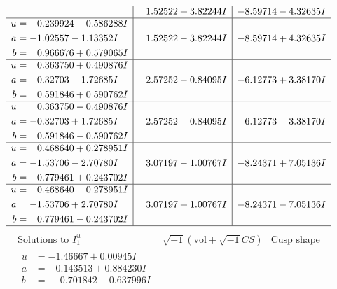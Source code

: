 \documentclass[1p]{elsarticle_modified}
\theoremstyle{definition}
\newcommand{\I}{\sqrt{-1}}
\begin{document}
$$\begin{array}{c|c|c}
 & \phantom{-}1.52522 + 3.82244 I & -8.59714 - 4.32635 I \\ \hline\begin{aligned}
u &= \phantom{-}0.239924 - 0.586288 I \\
a &= -1.02557 - 1.13352 I \\
b &= \phantom{-}0.966676 + 0.579065 I\end{aligned}
 & \phantom{-}1.52522 - 3.82244 I & -8.59714 + 4.32635 I \\ \hline\begin{aligned}
u &= \phantom{-}0.363750 + 0.490876 I \\
a &= -0.32703 - 1.72685 I \\
b &= \phantom{-}0.591846 + 0.590762 I\end{aligned}
 & \phantom{-}2.57252 - 0.84095 I & -6.12773 + 3.38170 I \\ \hline\begin{aligned}
u &= \phantom{-}0.363750 - 0.490876 I \\
a &= -0.32703 + 1.72685 I \\
b &= \phantom{-}0.591846 - 0.590762 I\end{aligned}
 & \phantom{-}2.57252 + 0.84095 I & -6.12773 - 3.38170 I \\ \hline\begin{aligned}
u &= \phantom{-}0.468640 + 0.278951 I \\
a &= -1.53706 - 2.70780 I \\
b &= \phantom{-}0.779461 + 0.243702 I\end{aligned}
 & \phantom{-}3.07197 - 1.00767 I & -8.24371 + 7.05136 I \\ \hline\begin{aligned}
u &= \phantom{-}0.468640 - 0.278951 I \\
a &= -1.53706 + 2.70780 I \\
b &= \phantom{-}0.779461 - 0.243702 I\end{aligned}
 & \phantom{-}3.07197 + 1.00767 I & -8.24371 - 7.05136 I\\
 \hline 
 \end{array}$$\newpage$$\begin{array}{c|c|c}  
\text{Solutions to }I^u_{1}& \I (\text{vol} + \sqrt{-1}CS) & \text{Cusp shape}\\
 \hline 
\begin{aligned}
u &= -1.46667 + 0.00945 I \\
a &= -0.143513 + 0.884230 I \\
b &= \phantom{-}0.701842 - 0.637996 I\end{aligned}

\end{array}$$
\end{document}
